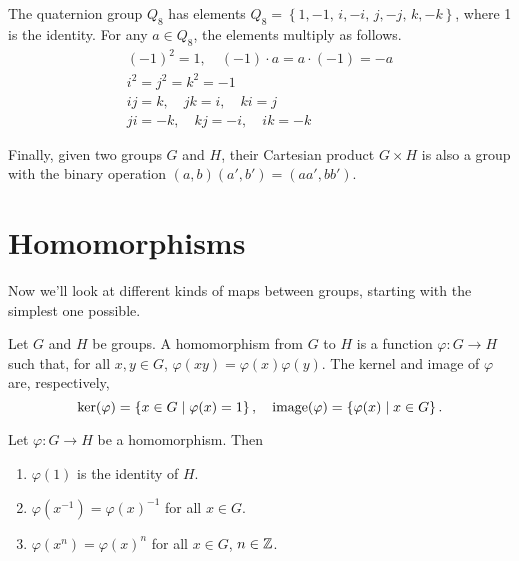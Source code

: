 \documentclass[../m171main.tex]{subfiles}
\begin{document}
\begin{definition}
    The quaternion group $Q_8$ has elements $Q_8 = \left\{ 1, -1, \, i, -i, \, j, -j, \, k, -k \right\}$, where 1 is the identity.
    For any $a \in Q_8$, the elements multiply as follows.
    \begin{gather*}
        (-1)^2 = 1, \quad (-1) \cdot a = a \cdot (-1) = -a \\
        i^2 = j^2 = k^2 = -1 \\
        ij = k, \quad jk = i, \quad ki = j \\
        ji = -k, \quad kj = -i, \quad ik = -k
    \end{gather*}
\end{definition}

Finally, given two groups $G$ and $H$, their Cartesian product $G \times H$ is also a group with the binary operation $(a, b)(a', b') = (aa', bb')$.

\section{Homomorphisms}
Now we'll look at different kinds of maps between groups, starting with the simplest one possible.

\begin{definition}[Homomorphism]
    Let $G$ and $H$ be groups.
    A homomorphism from $G$ to $H$ is a function $\varphi : G \to H$ such that, for all $x,y \in G$, $\varphi(xy) = \varphi(x) \varphi(y)$.
    The kernel and image of $\varphi$ are, respectively,
    \[ \ker (\varphi) = \left\{ x \in G \; | \; \varphi(x) = 1 \right\}, \quad \textrm{image} (\varphi) = \left\{ \varphi(x) \; | \; x \in G \right\}. \]
\end{definition}


\begin{theorem}[]
    Let $\varphi : G \to H$ be a homomorphism.
    Then
    \begin{enumerate}[label=(\alph*)]
        \item $\varphi(1)$ is the identity of $H$.
        \item $\varphi(x^{-1}) = \varphi(x)^{-1}$ for all $x \in G$.
        \item $\varphi(x^{n}) = \varphi(x)^{n}$ for all $x \in G$, $n \in \mathbb{Z}$.
    \end{enumerate}
\end{theorem}
\end{document}
